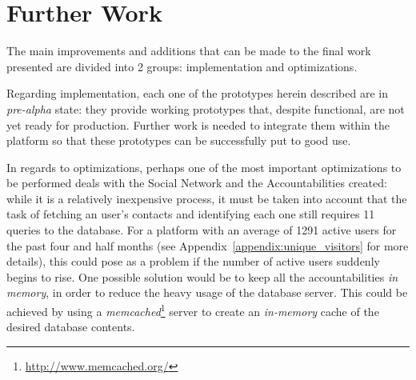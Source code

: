 \section{Further Work}\label{sec:further_work}

The main improvements and additions that can be made to the final work presented are divided into 2 groups: implementation and optimizations.

Regarding implementation, each one of the prototypes herein described are in \textit{pre-alpha} state: they provide working prototypes that, despite functional, are not yet ready for production. Further work is needed to integrate them within the platform so that these prototypes can be successfully put to good use.

In regards to optimizations, perhaps one of the most important optimizations to be performed deals with the Social Network and the Accountabilities created: while it is a relatively inexpensive process, it must be taken into account that the task of fetching an user's contacts and identifying each one still requires 11 queries to the database. For a platform with an average of 1291 active users for the past four and half months (see Appendix~\ref{appendix:unique_visitors} for more details), this could pose as a problem if the number of active users suddenly begins to rise. One possible solution would be to keep all the accountabilities \emph{in memory}, in order to reduce the heavy usage of the database server. This could be achieved by using a \emph{memcached}\footnote{\url{http://www.memcached.org/}} server to create an \emph{in-memory} cache of the desired database contents.

